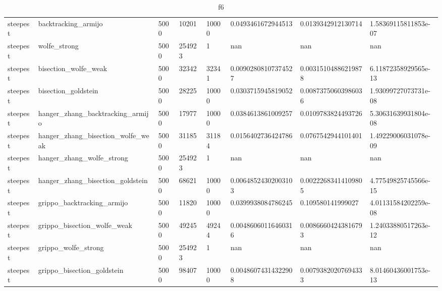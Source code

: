 \documentclass[a4paper,11pt]{article}
\numberwithin{equation}{section} %
\begin{document}
\begin{table}[h!]
{\begin{tabular}{|l|l|l|l|l|l|l|l|}
        steepest & backtracking\_armijo & 5000 & 10201 & 10000 & 0.0493461672944513 & 0.0139342912130714 & 1.58369115811853e-07 \\
        steepest & wolfe\_strong & 5000 & 254923 & 1 & nan & nan & nan \\
        steepest & bisection\_wolfe\_weak & 5000 & 32342 & 32341 & 0.00902808107374527 & 0.00315104886219878 & 6.11872358929565e-13 \\
        steepest & bisection\_goldstein & 5000 & 28225 & 10000 & 0.0303715945819052 & 0.00873750603986036 & 1.93099727073731e-08 \\
        steepest & hanger\_zhang\_backtracking\_armijo & 5000 & 17977 & 10000 & 0.0384613861009257 & 0.0109783824493726 & 5.30631639931804e-08 \\
        steepest & hanger\_zhang\_bisection\_wolfe\_weak & 5000 & 31185 & 31184 & 0.0156402736424786 & 0.0767542944101401 & 1.49229006031078e-09 \\
        steepest & hanger\_zhang\_wolfe\_strong & 5000 & 254923 & 1 & nan & nan & nan \\
        steepest & hanger\_zhang\_bisection\_goldstein & 5000 & 68621 & 10000 & 0.00648524302003103 & 0.00222683414109805 & 4.77549825745566e-15 \\
        steepest & grippo\_backtracking\_armijo & 5000 & 11820 & 10000 & 0.0399938084786245 & 0.109580141999027 & 4.01131584202259e-08 \\
        steepest & grippo\_bisection\_wolfe\_weak & 5000 & 49245 & 49244 & 0.00486060116460316 & 0.00866604243816793 & 1.24033880517263e-12 \\
        steepest & grippo\_wolfe\_strong & 5000 & 254923 & 1 & nan & nan & nan \\
        steepest & grippo\_bisection\_goldstein & 5000 & 98407 & 10000 & 0.00486074314322908 & 0.00793820207694333 & 8.01460436001753e-13 \\

\end{tabular}}
\caption{f6}
\label{table:f6}
\end{table}
\end{document}
